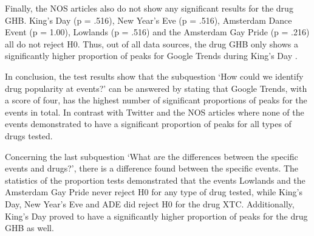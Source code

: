 Finally, the NOS articles also do not show any significant results for the drug GHB. King’s Day (p = .516), New Year’s Eve (p = .516), Amsterdam Dance Event (p = 1.00), Lowlands (p = .516) and the Amsterdam Gay Pride (p = .216) all do not reject H0. Thus, out of all data sources, the drug GHB only shows a significantly higher proportion of peaks for Google Trends during King’s Day . 

In conclusion, the test results show that the subquestion ‘How could we identify drug popularity at events?’ can be answered by stating that Google Trends, with a score of four, has the highest number of significant proportions of peaks for the events in total. In contrast with Twitter and the NOS articles where none of the events demonstrated to have a significant proportion of peaks for all types of drugs tested. 

Concerning the last subquestion ‘What are the differences between the specific events and drugs?’, there is a difference found between the specific events. The statistics of the proportion tests demonstrated that the events Lowlands and the Amsterdam Gay Pride never reject H0 for any type of drug tested, while King’s Day, New Year’s Eve and ADE did reject H0 for the drug XTC. Additionally, King’s Day proved to have a significantly higher proportion of peaks for the drug GHB as well.